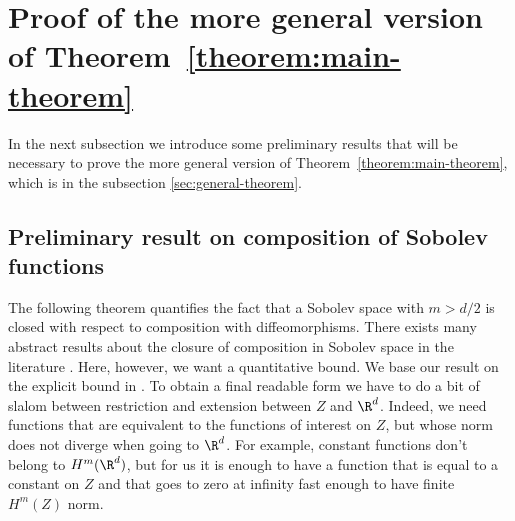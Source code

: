 \section{Proof of the more general version of Theorem~\ref{theorem:main-theorem}}


In the next subsection we introduce some preliminary results that will be necessary to prove the more general version of Theorem~\ref{theorem:main-theorem}, which is in the subsection \cref{sec:general-theorem}.

\subsection{Preliminary result on composition of Sobolev functions}\label{sec:functions}
The following theorem quantifies the fact that a Sobolev space with $m > d/2$ is closed with respect to composition with diffeomorphisms. There exists many abstract results about the closure of composition in Sobolev space in the literature  \citep[see \emph{e.g.}][]{bruveris2017regularity}. Here, however, we want a quantitative bound. We base our result on the explicit bound in \citet{bourdaud2011composition}. To obtain a final readable form we have to do a bit of slalom between restriction and extension between $Z$ and $\R^d$. Indeed, we need functions that are equivalent to the functions of interest on $Z$, but whose norm does not diverge when going to $\R^d$. For example, constant functions don't belong to $H^m(\R^d)$, but for us it is enough to have a function that is equal to a constant on $Z$ and that goes to zero at infinity fast enough to have finite $H^m(Z)$ norm.


